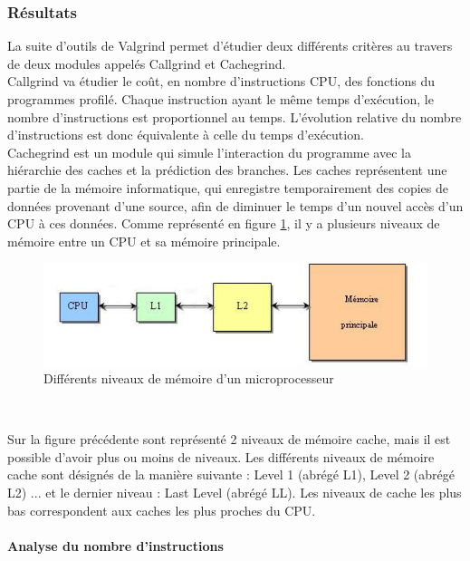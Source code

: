 \documentclass[10pt]{report}
\begin{document}
		\subsubsection{Résultats}
		La suite d'outils de Valgrind permet d'étudier deux différents critères au travers de deux modules appelés Callgrind et Cachegrind.\\
		Callgrind va étudier le coût, en nombre d'instructions CPU, des fonctions du programmes profilé. Chaque instruction ayant le même temps d'exécution, le nombre d'instructions est proportionnel au temps. L'évolution relative du nombre d'instructions est donc équivalente à celle du temps d'exécution.\\
		Cachegrind est un module qui simule l'interaction du programme avec la hiérarchie des caches et la prédiction des branches. Les caches représentent une partie de la mémoire informatique, qui enregistre temporairement des copies de données provenant d'une source, afin de diminuer le temps d'un nouvel accès d'un CPU à ces données. Comme représenté en figure \ref{Différents niveaux de mémoire d'un microprocesseur}, il y a plusieurs niveaux de mémoire entre un CPU et sa mémoire principale. 

		\begin{figure}[h!]
			\begin{center}
				\includegraphics[width=13cm]{Reports/figures/Mem_hierarchy.jpg}
			\end{center}	
			\caption{Différents niveaux de mémoire d'un microprocesseur}
			\label{Différents niveaux de mémoire d'un microprocesseur}
		\end{figure}~\par
		Sur la figure précédente sont représenté 2 niveaux de mémoire cache, mais il est possible d'avoir plus ou moins de niveaux.
		Les différents niveaux de mémoire cache sont désignés de la manière suivante : Level 1 (abrégé L1), Level 2 (abrégé L2) ... et le dernier niveau : Last Level (abrégé LL). Les niveaux de cache les plus bas correspondent aux caches les plus proches du CPU. 
		
		\paragraph{Analyse du nombre d'instructions}
%		
		
\end{document}
